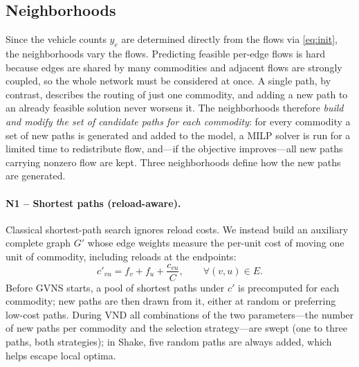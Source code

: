 \documentclass[runningheads]{llncs}
\newcommand{\E}{E}
\begin{document}
\subsection{Neighborhoods}
Since the vehicle counts $y_e$ are determined directly from the flows via
\eqref{eq:init}, the neighborhoods vary the flows. Predicting feasible
per-edge flows is hard because edges are shared by many commodities and
adjacent flows are strongly coupled, so the whole network must be considered
at once. A single path, by contrast, describes the routing of just one
commodity, and adding a new path to an already feasible solution never worsens
it. The neighborhoods therefore \emph{build and modify the set of candidate
paths for each commodity}: for every commodity a set of new paths is generated
and added to the model, a MILP solver is run for a limited time to
redistribute flow, and---if the objective improves---all new paths carrying
nonzero flow are kept. Three neighborhoods define how the new paths are
generated.

\paragraph{N1 -- Shortest paths (reload-aware).}
Classical shortest-path search ignores reload costs. We instead build an
auxiliary complete graph $G'$ whose edge weights measure the per-unit cost of
moving one unit of commodity, including reloads at the endpoints:
\begin{equation}
c'_{vu}=f_v+f_u+\frac{c_{vu}}{C}, \qquad \forall (v,u)\in \E .
\end{equation}
Before GVNS starts, a pool of shortest paths under $c'$ is precomputed for each
commodity; new paths are then drawn from it, either at random or preferring
low-cost paths. During VND all combinations of the two parameters---the number of
new paths per commodity and the selection strategy---are swept (one to three
paths, both strategies); in Shake, five random paths are always added, which helps
escape local optima.
\end{document}
